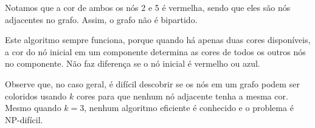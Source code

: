 Notamos que a cor de ambos os nós 2 e 5 é vermelha, sendo que eles são nós adjacentes no grafo. Assim, o grafo não é bipartido.

Este algoritmo sempre funciona, porque quando há apenas duas cores disponíveis, a cor do nó inicial em um componente determina as cores de todos os outros nós no componente. Não faz diferença se o nó inicial é vermelho ou azul.

Observe que, no caso geral, é difícil descobrir se os nós em um grafo podem ser coloridos usando $k$ cores para que nenhum nó adjacente tenha a mesma cor. Mesmo quando $k=3$, nenhum algoritmo eficiente é conhecido e o problema é NP-difícil.
